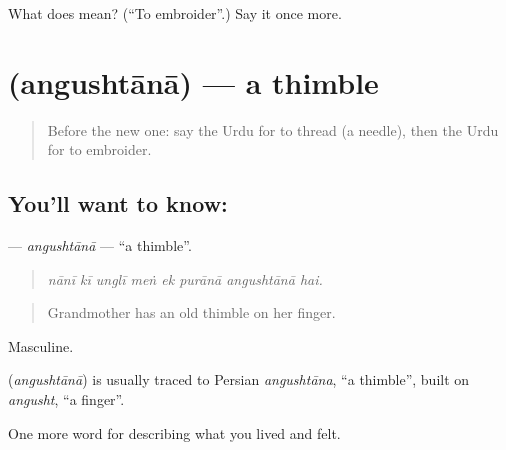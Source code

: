 \begin{tcolorbox}[breakable,colback=teal!4,colframe=teal!35!black,title={Before you move on}]
What does  mean? (\textquotedblleft{}To embroider\textquotedblright{}.) Say it once more.
\end{tcolorbox}
\section[\texorpdfstring{\ur{انگشتانہ} (angushtānā)}{انگشتانہ (angushtānā)}]{ (angushtānā) — a thimble}

\label{lesson:UR-C514-angushtana}



\begin{quote}
Before the new one: say the Urdu for to thread (a needle), then the Urdu for to embroider.
\end{quote}

\subsection*{You'll want to know: }
\textbf{} — \emph{angushtānā} — \textquotedblleft{}a thimble\textquotedblright{}.

\begin{quote}
       
\end{quote}

\begin{quote}
\emph{nānī kī unglī meṅ ek purānā angushtānā hai.}
\end{quote}

\begin{quote}
Grandmother has an old thimble on her finger.
\end{quote}

Masculine.

\begin{cousinweb}
\textbf{} (\emph{angushtānā}) is usually traced to Persian \emph{angushtāna}, \textquotedblleft{}a thimble\textquotedblright{}, built on \emph{angusht}, \textquotedblleft{}a finger\textquotedblright{}.
\end{cousinweb}

\begin{grammarlens}[title={What you've built}]
One more word for describing what you lived and felt.
\end{grammarlens}

